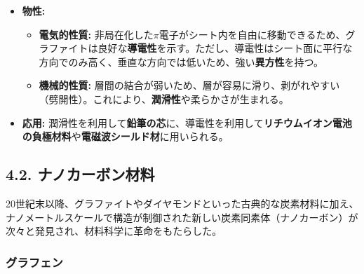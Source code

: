 \documentclass[11pt,a4paper]{ltjsarticle}
\begin{document}
\begin{itemize}
\item \textbf{物性:}
\begin{itemize}
\item \textbf{電気的性質:} 非局在化した$\pi$電子がシート内を自由に移動できるため、グラファイトは良好な\textbf{導電性}を示す。ただし、導電性はシート面に平行な方向でのみ高く、垂直な方向では低いため、強い\textbf{異方性}を持つ。
\item \textbf{機械的性質:} 層間の結合が弱いため、層が容易に滑り、剥がれやすい（劈開性）。これにより、\textbf{潤滑性}や柔らかさが生まれる。
\end{itemize}
\item \textbf{応用:} 潤滑性を利用して\textbf{鉛筆の芯}に、導電性を利用して\textbf{リチウムイオン電池の負極材料}や\textbf{電磁波シールド材}に用いられる。
\end{itemize}

\subsection*{4.2. ナノカーボン材料}

20世紀末以降、グラファイトやダイヤモンドといった古典的な炭素材料に加え、ナノメートルスケールで構造が制御された新しい炭素同素体（ナノカーボン）が次々と発見され、材料科学に革命をもたらした。

\subsubsection*{グラフェン}
\end{document}
